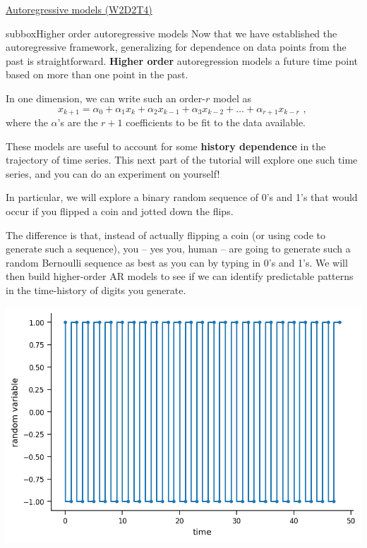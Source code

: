 \begin{textbox}{\href{https://compneuro.neuromatch.io/tutorials/W2D2_LinearSystems/student/W2D2_Tutorial4.html}{Autoregressive models (W2D2T4)} }
\begin{subbox}{subbox}{Higher order autoregressive models}
\scriptsize
Now that we have established the autoregressive framework, generalizing for dependence on data points from the past is straightforward. \textbf{Higher order} autoregression models a future time point based on more than one point in the past.

In one dimension, we can write such an order-$r$ model as
$$
x_{k+1} = \alpha_0 + \alpha_1 x_k + \alpha_2 x_{k-1} + \alpha_3 x_{k-2} + \dots + \alpha_{r+1} x_{k-r} \text{  , }
$$
where the $\alpha$'s are the $r+1$ coefficients to be fit to the data available.

These models are useful to account for some \textbf{history dependence} in the trajectory of time series. This next part of the tutorial will explore one such time series, and you can do an experiment on yourself!

In particular, we will explore a binary random sequence of 0's and 1's that would occur if you flipped a coin and jotted down the flips. 

The difference is that, instead of actually flipping a coin (or using code to generate such a sequence), you -- yes you, human -- are going to generate such a random Bernoulli sequence as best as you can by typing in 0's and 1's. We will then build higher-order AR models to see if we can identify predictable patterns in the time-history of digits you generate.
\begin{center}
\includegraphics[scale=0.25]{Figures/LS/CDS_Figure11.png}
\end{center}

\end{subbox}

\end{textbox}

